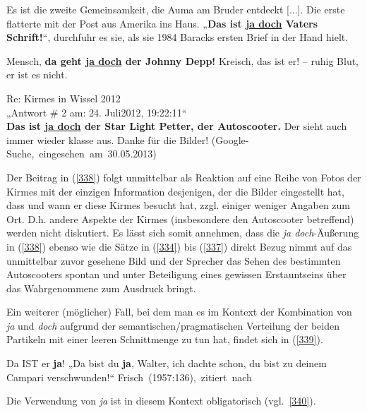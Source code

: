 \begin{exe}
	\ex\label{336}
 
	Es ist die zweite Gemeinsamkeit, die Auma am Bruder entdeckt [...]. Die erste flatterte mit der Post aus Amerika ins Haus. „\textbf{Das ist 			\underline{ja doch} Vaters Schrift!}“, durchfuhr es sie, als sie 1984 Baracks ersten Brief in der Hand hielt.
\end{exe}
	
\begin{exe}
	\ex\label{337}
 
	Mensch, \textbf{da geht \underline{ja doch} der Johnny Depp!} Kreisch, das ist er! – ruhig Blut, er ist es nicht.
\end{exe}

\begin{exe}
	\ex\label{338}
 
	Re: Kirmes in Wissel 2012\\
	„Antwort \# 2 am: 24. Juli2012, 19:22:11“\\
	\textbf{Das ist \underline{ja doch} der Star Light Petter, der Autoscooter.} Der sieht auch immer wieder klasse aus. Danke für die Bilder!	
	\newline	
	\hbox{}\hfill\hbox{(Google-Suche, eingesehen am 30.05.2013)}	
\end{exe}									       
Der Beitrag in (\ref{338}) folgt unmittelbar als Reaktion auf eine Reihe von Fotos der Kirmes mit der einzigen Information desjenigen, der die Bilder eingestellt hat, dass und wann er diese Kirmes besucht hat, zzgl. einiger weniger Angaben zum Ort. D.h. andere Aspekte der Kirmes (insbesondere den Autoscooter betreffend) werden nicht diskutiert. Es lässt sich somit annehmen, dass die \textit{ja doch}-Äußerung in (\ref{338}) ebenso wie die Sätze in (\ref{334}) bis (\ref{337}) direkt Bezug nimmt auf das unmittelbar zuvor gesehene Bild und der Sprecher das Sehen des bestimmten Autoscooters spontan und unter Beteiligung eines gewissen Erstauntseins über das Wahrgenommene zum Ausdruck bringt.

Ein weiterer (möglicher) Fall, bei dem man es im Kontext der Kombination von \textit{ja} und \textit{doch} aufgrund der semantischen/pragmatischen Verteilung der beiden Partikeln mit einer leeren Schnittmenge zu tun hat, findet sich in (\ref{339}).

\begin{exe}
	\ex\label{339} 
		\begin{xlist}	
			\ex\label{339a} Da IST er \textbf{ja}!
			\ex\label{339b} „Da bist du \textbf{ja}, Walter, ich dachte schon, du bist zu deinem Campari verschwunden!“  	         
			\hfill\hbox{Frisch (1957:136), zitiert nach \citet[167]{Rinas2006}}
		\end{xlist}
\end{exe}										      	     
Die Verwendung von \textit{ja} ist in diesem Kontext obligatorisch (vgl.\ \ref{340}). 

